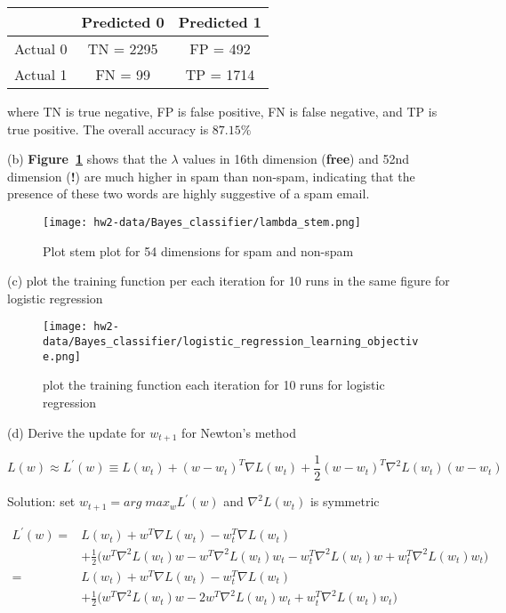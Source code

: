 \documentclass[11pt]{report}
\begin{document}
\begin{center}
\begin{tabular}{ |c|c|c| } 
 \hline
  & Predicted 0  & Predicted 1 \\ 
 \hline
 Actual 0 & TN = 2295 & FP = 492 \\ 
  \hline
Actual 1  & FN = 99 &  TP = 1714 \\ 
 \hline
\end{tabular}
\end{center}

\justify where TN is true negative, FP is false positive, FN is false negative, and TP is true positive. The overall accuracy is \textbf{$87.15\%$}


\justify (b) \textbf{Figure~\ref{fig:lambda_stem}} shows that the $\lambda$ values in 16th dimension (\textbf{free}) and 52nd dimension (\textbf{!}) are much higher in spam than non-spam, indicating that the presence of these two words are highly suggestive of a spam email. 

\begin{figure}[h]
\texttt{[image: hw2-data/Bayes\_classifier/lambda\_stem.png]}
\centering
\caption{Plot stem plot for 54 dimensions for spam and non-spam}
\label{fig:lambda_stem}
\end{figure}

\pagebreak

\justify (c) plot the training function per each iteration for 10 runs in the same figure for logistic regression
\begin{figure}[h]
\texttt{[image: hw2-data/Bayes\_classifier/logistic\_regression\_learning\_objective.png]}
\centering
\caption{plot the training function each iteration for 10 runs for logistic regression}
\label{fig:logistic_regression_learning_objective}
\end{figure}


\justify (d) Derive the update for $w_{t+1}$ for Newton's method

\[
L(w) \approx L^{'} (w)   \equiv L(w_{t}) + (w - w_{t})^{T} \nabla{L(w_{t})} + \frac{1}{2} (w - w_{t})^{T} \nabla^{2}{L(w_{t})} (w - w_{t})
\]

\justify Solution: set $w_{t+1} = arg\;max_{w} L^{'} (w) $ and $\nabla^{2}{L(w_{t})}$ is symmetric

\begin{align*}
L^{'} (w) =& L(w_{t}) + w^{T} \nabla{L(w_{t})}  - w_{t}^{T} \nabla{L(w_{t})} \\
&+ \frac{1}{2} \Biggl( w^{T} \nabla^{2}{L(w_{t})} w  - w^{T}\nabla^{2}{L(w_{t})}  w_{t} - w^{T}_{t} \nabla^{2}{L(w_{t})} w + w^{T}_{t} \nabla^{2}{L(w_{t})}  w_{t}\Biggr) \\
=& L(w_{t}) + w^{T} \nabla{L(w_{t})}  - w_{t}^{T} \nabla{L(w_{t})} \\
&+ \frac{1}{2} \Biggl( w^{T} \nabla^{2}{L(w_{t})} w  - 2w^{T}\nabla^{2}{L(w_{t})}  w_{t} + w^{T}_{t} \nabla^{2}{L(w_{t})}  w_{t} \Biggr)
\end{align*}
\end{document}
